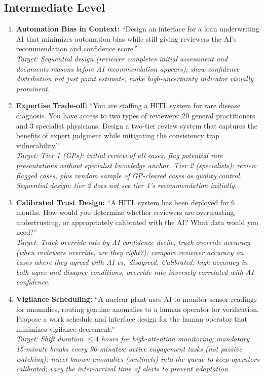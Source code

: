 \subsection{Intermediate Level}

\begin{enumerate}
    \item \textbf{Automation Bias in Context:} ``Design an interface for a loan underwriting AI that minimizes automation bias while still giving reviewers the AI's recommendation and confidence score.''\\
    \textit{Target: Sequential design (reviewer completes initial assessment and documents reasons before AI recommendation appears); show confidence distribution not just point estimate; make high-uncertainty indicator visually prominent.}

    \item \textbf{Expertise Trade-off:} ``You are staffing a HITL system for rare disease diagnosis. You have access to two types of reviewers: 20 general practitioners and 3 specialist physicians. Design a two-tier review system that captures the benefits of expert judgment while mitigating the consistency trap vulnerability.''\\
    \textit{Target: Tier 1 (GPs): initial review of all cases, flag potential rare presentations without specialist knowledge anchor. Tier 2 (specialists): review flagged cases, plus random sample of GP-cleared cases as quality control. Sequential design: tier 2 does not see tier 1's recommendation initially.}

    \item \textbf{Calibrated Trust Design:} ``A HITL system has been deployed for 6 months. How would you determine whether reviewers are overtrusting, undertrusting, or appropriately calibrated with the AI? What data would you need?''\\
    \textit{Target: Track override rate by AI confidence decile; track override accuracy (when reviewers override, are they right?); compare reviewer accuracy on cases where they agreed with AI vs.\ disagreed. Calibrated: high accuracy in both agree and disagree conditions, override rate inversely correlated with AI confidence.}

    \item \textbf{Vigilance Scheduling:} ``A nuclear plant uses AI to monitor sensor readings for anomalies, routing genuine anomalies to a human operator for verification. Propose a work schedule and interface design for the human operator that minimizes vigilance decrement.''\\
    \textit{Target: Shift duration $\leq 4$ hours for high-attention monitoring; mandatory 15-minute breaks every 90 minutes; active engagement tasks (not passive watching); inject known anomalies (sentinels) into the queue to keep operators calibrated; vary the inter-arrival time of alerts to prevent adaptation.}
\end{enumerate}

